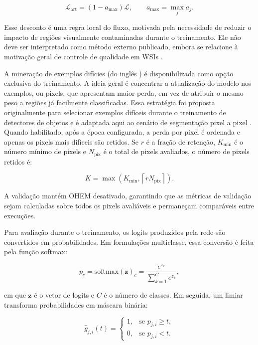 \begin{equation}
    \mathcal{L}_{\mathrm{art}} =
    (1-a_{\max})\mathcal{L},
    \qquad
    a_{\max}=\max_j a_j .
    \label{eq:artifact_loss}
\end{equation}

Esse desconto é uma regra local do fluxo, motivada pela necessidade de reduzir o
impacto de regiões visualmente contaminadas durante o treinamento. Ele não deve
ser interpretado como método externo publicado, embora se relacione à motivação
geral de controle de qualidade em WSIs \cite{weng2024grandqc}.

A mineração de exemplos difícies (do inglês  ) é disponibilizada como opção exclusiva do
treinamento. A ideia geral é concentrar a atualização do modelo nos exemplos, ou
pixels, que apresentam maior perda, em vez de atribuir o mesmo peso a regiões já
facilmente classificadas. Essa estratégia foi proposta originalmente para
selecionar exemplos difíceis durante o treinamento de detectores de objetos e é
adaptada aqui ao cenário de segmentação pixel a pixel
\cite{shrivastava2016ohem}. Quando habilitado, após a época configurada, a perda
por pixel é ordenada e apenas os pixels mais difíceis são retidos. Se $r$ é a
fração de retenção, $K_{\min}$ é o número mínimo de pixels e $N_{\mathrm{pix}}$
é o total de pixels avaliados, o número de pixels retidos é:

\begin{equation}
    K =
    \max\left(K_{\min}, \left\lceil rN_{\mathrm{pix}}\right\rceil\right).
    \label{eq:ohem_k}
\end{equation}

A validação mantém OHEM desativado, garantindo que as métricas de validação sejam
calculadas sobre todos os pixels avaliáveis e permaneçam comparáveis entre
execuções.

Para avaliação durante o treinamento, os logits produzidos pela rede são
convertidos em probabilidades. Em formulações multiclasse, essa conversão é feita
pela função softmax:

\begin{equation}\label{eq:softmax}
    p_c = \mathrm{softmax}(\mathbf{z})_c =
    \frac{e^{z_c}}{\sum_{k=1}^{C}e^{z_k}},
\end{equation}

em que $\mathbf{z}$ é o vetor de logits e $C$ é o número de classes. Em seguida,
um limiar transforma probabilidades em máscara binária:

\begin{equation}\label{eq:binarizacao-threshold}
    \hat{g}_{j,i}(t)=
    \begin{cases}
        1, & \text{se } p_{j,i}\geq t,\\
        0, & \text{se } p_{j,i}<t.
    \end{cases}
\end{equation}

